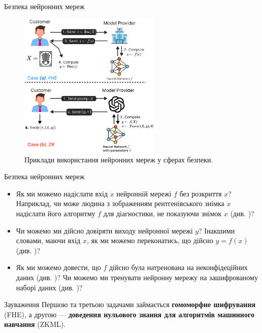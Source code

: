 \documentclass{zkdl-presentation-template}
\begin{document}
    \begin{frame}{Безпека нейронних мереж}
        \begin{figure}
            \centering
            \includegraphics[width=0.6\textwidth]{images/use-cases.pdf}
            \caption{Приклади використання нейронних мереж у сферах безпеки.}
            \label{fig:nn-attack}
        \end{figure}
    \end{frame}

    \begin{frame}{Безпека нейронних мереж}
        \begin{itemize}
            \item Як ми можемо надіслати вхід $x$ нейронній мережі $f$ без
            розкриття $x$? Наприклад, чи може людина з зображенням
            рентгенівського знімка $x$ надіслати його алгоритму $f$ для
            діагностики, не показуючи знімок $x$ (див. \cite{cryptonets})?
            \item Чи можемо ми дійсно довіряти виходу нейронної мережі $y$?
            Інакшими словами, маючи вхід $x$, як ми можемо переконатись, що 
            дійсно $y = f(x)$ (див. \cite{nn-ezkl})? 
            \item Як ми можемо довести, що $f$ дійсно була натренована на
            неконфідеційних даних (див. \cite{zk-training})? Чи можемо ми
            тренувати нейронну мережу на зашифрованому наборі даних
            (див. \cite{fhe-training})?
        \end{itemize}

        \begin{block}{Зауваження}
            Першою та третьою задачами займається \textbf{гомоморфне шифрування}
            (FHE), а другою --- \textbf{доведення нульового знання для
            алгоритмів машинного навчання} (ZKML).
        \end{block}
    \end{frame}
\end{document}
